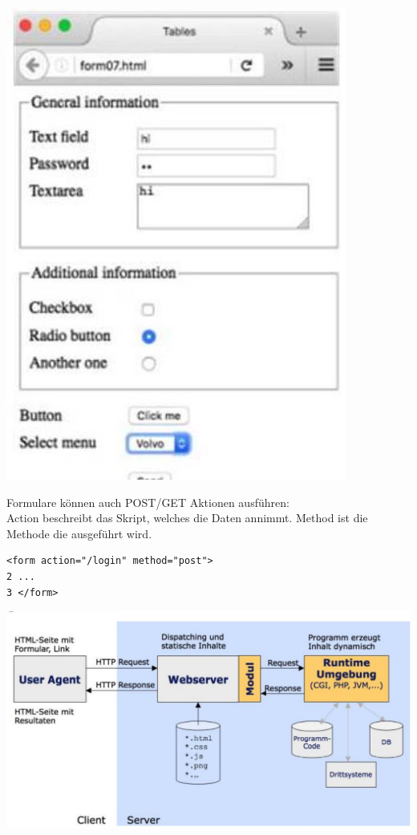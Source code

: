 \documentclass[10pt]{article}
\begin{document}
\begin{center}
\includegraphics[max width=\textwidth]{2024_12_29_858f09cde51177c71657g-29}
\end{center}

Formulare können auch POST/GET Aktionen ausführen:\\
Action beschreibt das Skript, welches die Daten annimmt. Method ist die Methode die ausgeführt wird.

\begin{verbatim}
<form action="/login" method="post">
2 ...
3 </form>
\end{verbatim}

\begin{center}
\includegraphics[max width=\textwidth]{2024_12_29_858f09cde51177c71657g-29(1)}
\end{center}
\end{document}
